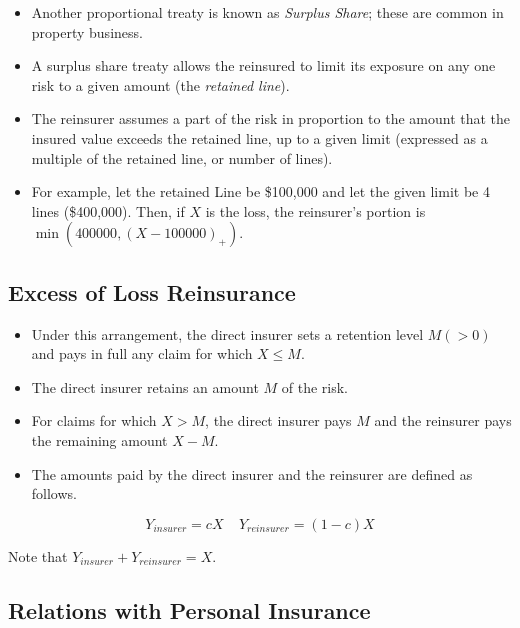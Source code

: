 \documentclass[]{book}
\theoremstyle{definition}
\theoremstyle{definition}
\theoremstyle{definition}
\theoremstyle{remark}
\begin{document}
\begin{itemize}
\item
  Another proportional treaty is known as \emph{Surplus Share}; these
  are common in property business.
\item
  A surplus share treaty allows the reinsured to limit its exposure on
  any one risk to a given amount (the \emph{retained line}).
\item
  The reinsurer assumes a part of the risk in proportion to the amount
  that the insured value exceeds the retained line, up to a given limit
  (expressed as a multiple of the retained line, or number of lines).
\item
  For example, let the retained Line be \$100,000 and let the given
  limit be 4 lines (\$400,000). Then, if \(X\) is the loss, the
  reinsurer's portion is \(\min(400000, (X-100000)_+)\).
\end{itemize}

\subsection{Excess of Loss
Reinsurance}\label{excess-of-loss-reinsurance}

\begin{itemize}
\item
  Under this arrangement, the direct insurer sets a retention level
  \(M (>0)\) and pays in full any claim for which \(X \le M\).
\item
  The direct insurer retains an amount \(M\) of the risk.
\item
  For claims for which \(X > M\), the direct insurer pays \(M\) and the
  reinsurer pays the remaining amount \(X-M\).
\item
  The amounts paid by the direct insurer and the reinsurer are defined
  as follows.
\end{itemize}

\begin{equation*}
Y_{insurer} = c X \ \ \ \ \ Y_{reinsurer} = (1-c) X
\end{equation*}

Note that \(Y_{insurer}+Y_{reinsurer}=X\).

\subsection{Relations with Personal
Insurance}\label{relations-with-personal-insurance}
\end{document}
